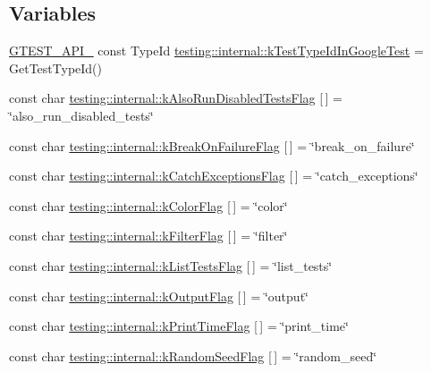 \subsection*{Variables}
\begin{DoxyCompactItemize}
\item 
\hyperlink{gtest-port_8h_aa73be6f0ba4a7456180a94904ce17790}{G\-T\-E\-S\-T\-\_\-\-A\-P\-I\-\_\-} const Type\-Id \hyperlink{namespacetesting_1_1internal_acac7993efabbd9dd62c1e9c7d143a72f}{testing\-::internal\-::k\-Test\-Type\-Id\-In\-Google\-Test} = Get\-Test\-Type\-Id()
\item 
const char \hyperlink{namespacetesting_1_1internal_a2c66dd28db3875de41836ffb69f5e38f}{testing\-::internal\-::k\-Also\-Run\-Disabled\-Tests\-Flag} \mbox{[}$\,$\mbox{]} = \char`\"{}also\-\_\-run\-\_\-disabled\-\_\-tests\char`\"{}
\item 
const char \hyperlink{namespacetesting_1_1internal_a3ac1c81fca74b3efd59ad92b8c87607c}{testing\-::internal\-::k\-Break\-On\-Failure\-Flag} \mbox{[}$\,$\mbox{]} = \char`\"{}break\-\_\-on\-\_\-failure\char`\"{}
\item 
const char \hyperlink{namespacetesting_1_1internal_a425758b6c799546541730db3069ab6ca}{testing\-::internal\-::k\-Catch\-Exceptions\-Flag} \mbox{[}$\,$\mbox{]} = \char`\"{}catch\-\_\-exceptions\char`\"{}
\item 
const char \hyperlink{namespacetesting_1_1internal_abd2c557df2babd71d213882d4a9dd5c5}{testing\-::internal\-::k\-Color\-Flag} \mbox{[}$\,$\mbox{]} = \char`\"{}color\char`\"{}
\item 
const char \hyperlink{namespacetesting_1_1internal_a81f3deec3ebb5c25e9e71f0ec088302c}{testing\-::internal\-::k\-Filter\-Flag} \mbox{[}$\,$\mbox{]} = \char`\"{}filter\char`\"{}
\item 
const char \hyperlink{namespacetesting_1_1internal_a1042c47d58fd11f22540c9b4e463b20a}{testing\-::internal\-::k\-List\-Tests\-Flag} \mbox{[}$\,$\mbox{]} = \char`\"{}list\-\_\-tests\char`\"{}
\item 
const char \hyperlink{namespacetesting_1_1internal_a634b057c35286dfe481716ddfca5b334}{testing\-::internal\-::k\-Output\-Flag} \mbox{[}$\,$\mbox{]} = \char`\"{}output\char`\"{}
\item 
const char \hyperlink{namespacetesting_1_1internal_acf0224d65402c6f7a60ff8a11d313896}{testing\-::internal\-::k\-Print\-Time\-Flag} \mbox{[}$\,$\mbox{]} = \char`\"{}print\-\_\-time\char`\"{}
\item 
const char \hyperlink{namespacetesting_1_1internal_a7baa4bf341b58cc6ecb77c338df94972}{testing\-::internal\-::k\-Random\-Seed\-Flag} \mbox{[}$\,$\mbox{]} = \char`\"{}random\-\_\-seed\char`\"{}

\end{DoxyCompactItemize}
